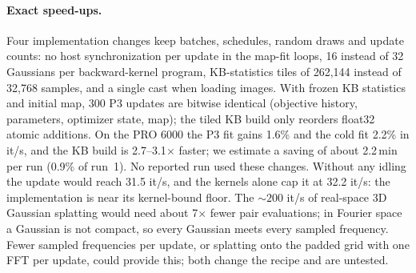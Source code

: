 \paragraph{Exact speed-ups.}
Four implementation changes keep batches, schedules, random draws and update counts: no host synchronization per update in the map-fit loops, 16 instead of 32 Gaussians per backward-kernel program, KB-statistics tiles of 262{,}144 instead of 32{,}768 samples, and a single cast when loading images.
With frozen KB statistics and initial map, 300 P3 updates are bitwise identical (objective history, parameters, optimizer state, map); the tiled KB build only reorders float32 atomic additions.
On the PRO 6000 the P3 fit gains 1.6\% and the cold fit 2.2\% in it/s, and the KB build is 2.7--3.1$\times$ faster; we estimate a saving of about 2.2\,min per run (0.9\% of run~1). No reported run used these changes.
Without any idling the update would reach 31.5 it/s, and the kernels alone cap it at 32.2 it/s: the implementation is near its kernel-bound floor.
The ${\sim}200$ it/s of real-space 3D Gaussian splatting would need about 7$\times$ fewer pair evaluations; in Fourier space a Gaussian is not compact, so every Gaussian meets every sampled frequency. Fewer sampled frequencies per update, or splatting onto the padded grid with one FFT per update, could provide this; both change the recipe and are untested.

